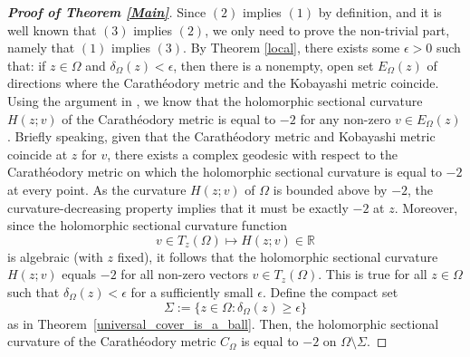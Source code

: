 \documentclass[12pt] {article}
\numberwithin{equation}{section}
\begin{document}
\begin{proof}  [{\bf Proof of Theorem \ref{Main}}]
Since $(2)$ implies $(1)$ by definition, and it is well known that $(3)$ implies $(2)$, we only need to prove the non-trivial part, namely that $(1)$ implies $(3)$. By Theorem \ref{local}, there exists some $\epsilon > 0$ such that: if $z \in \Omega$ and $\delta_\Omega(z) < \epsilon$, then there is a nonempty, open set $E_\Omega(z)$ of directions where the Carath\'eodory metric and the Kobayashi metric coincide.
Using the argument in \cite{W}, we know that 
the holomorphic sectional curvature $H(z; v)$ of the Carath\'eodory metric is equal to $-2$
 for any non-zero $v \in E_\Omega(z)$.
Briefly speaking, given that the Carath\'eodory metric and Kobayashi metric coincide at \(z\) for \(v\), there exists a complex geodesic with respect to the Carath\'eodory metric on which the holomorphic sectional curvature is equal to \(-2\) at every point. As the curvature \( H(z; v) \) of \(\Omega\) is bounded above by \(-2\), the curvature-decreasing property implies that it must be exactly \(-2\) at \(z\).  
Moreover, since the holomorphic sectional curvature function
\[
v \in T_z(\Omega) \mapsto H(z; v) \in \mathbb{R}
\]
is algebraic (with \(z\) fixed), 
it follows that the holomorphic sectional curvature \( H(z; v) \) equals \(-2\) for all non-zero vectors \( v \in T_z(\Omega) \).
This is true for all  $z\in \Omega$ such that 
$ \delta_\Omega(z) < \epsilon$ for a sufficiently small $\epsilon$.
Define the compact set 
\begin{equation} \label{sigma}
\Sigma := \{z \in \Omega : \delta_\Omega(z) \ge \epsilon\}
\end{equation}
as in Theorem~\ref{universal_cover_is_a_ball}. Then, the holomorphic sectional curvature of the Carath\'eodory metric $C_\Omega$ is equal to $-2$ on $\Omega \setminus \Sigma$.

\medskip

 


\end{proof}
\end{document}
